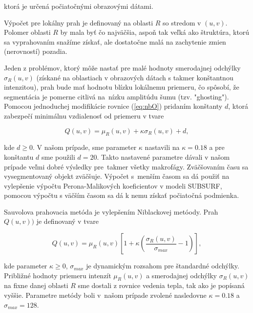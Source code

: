 \documentclass[a4paper,11pt,oneside]{article}%
\begin{document}
ktorá je určená počiatočnými obrazovými dátami.

Výpočet pre lokálny prah je definovaný na oblasti $R$ so stredom v $(u, v)$. Polomer oblasti $R$ by mala byť čo najväčšia, aspoň tak veľká ako štruktúra, ktorú sa vyprahovaním snažíme získať, ale dostatočne malá na zachytenie zmien (nerovností) pozadia.

Jeden z problémov, ktorý môže nastať pre malé hodnoty smerodajnej odchýlky $\sigma_R(u,v)$ (získané na oblastiach v obrazových dátach s takmer konštantnou intenzitou), prah bude mať hodnotu blízku lokálnemu priemeru, čo spôsobí, že segmentácia je pomerne citlivá na~nízku amplitúdu šumu (tzv. "ghosting"). Pomocou jednoduchej modifikácie rovnice (\ref{eq:nbO}) pridaním konštanty $d$, ktorá zabezpečí minimálnu vzdialenosť od priemeru v tvare

\begin{equation} \label{eq:nb}
Q(u,v) = \mu_R(u,v) + \kappa\sigma_R(u,v) + d,
\end{equation}

kde $d \geq 0$. V našom prípade, sme parameter $\kappa$ nastavili na $\kappa = 0.18$ a pre konštantu $d$ sme použili $d = 20$. Takto nastavené parametre dávali v našom prípade veľmi dobré výsledky pre~takmer všetky makrofágy. Zväčšovaním času sa vysegmentovaný objekt zväčšuje. Výpočet s~menším časom sa dá použiť na vylepšenie výpočtu Perona-Malikových koeficientov v modeli SUBSURF, pomocou výpočtu  s väčším časom sa dá k nemu získať počiatočná podmienka.


Sauvolova prahovacia metóda\cite{skripta1} je vylepšením Niblackovej metóody. Prah $Q(u,v))$ je definovaný v tvare

\begin{equation}  \label{eq:sav}
Q(u,v) = \mu_R(u,v) \left[1 + \kappa\left(\frac{\sigma_R(u,v)}{\sigma_{max}} - 1\right)\right],
\end{equation}

kde parameter $\kappa \geq 0$, $\sigma_{max}$ je dynamickým rozsahom pre štandardné odchýlky. Približné hodnoty priemeru intenzít $\mu_R(u,v)$ a smerodajnej odchýlky  $\sigma_R(u,v)$ na fixne danej oblasti $R$ sme dostali z rovnice vedenia tepla, tak ako je popísaná vyššie. 
Parametre metódy boli v~našom prípade zvolené nasledovne $\kappa = 0.18$ a  $\sigma_{max} = 128$. 
\end{document}
